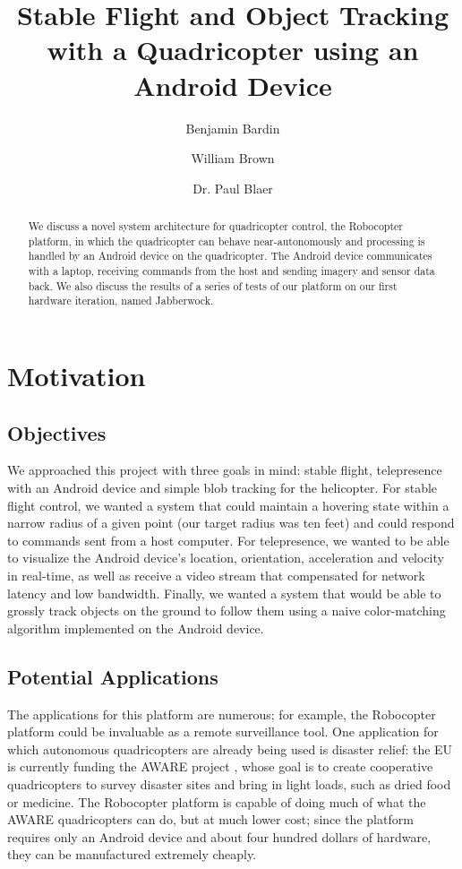 
\title{Stable Flight and Object Tracking with a Quadricopter using an
  Android Device}
\author{Benjamin Bardin \and William Brown 
  \and Dr. Paul Blaer}


\todolist

\maketitle

\begin{abstract}
  We discuss a novel system architecture for quadricopter control, the
  Robocopter platform, in which the quadricopter can behave
  near-autonomously and processing is handled by an Android device on
  the quadricopter. The Android device communicates with a laptop,
  receiving commands from the host and sending imagery and sensor data
  back. We also discuss the results of a series of tests of our
  platform on our first hardware iteration, named Jabberwock.
\end{abstract}
\tableofcontents

\section{Motivation}
\subsection{Objectives}
We approached this project with three goals in mind: stable flight,
telepresence with an Android device and simple blob tracking for the
helicopter. For stable flight control, we wanted a system that could
maintain a hovering state within a narrow radius of a given point (our
target radius was ten feet) and could respond to commands sent from a
host computer. For telepresence, we wanted to be able to visualize the
Android device's location, orientation, acceleration and velocity in
real-time, as well as receive a video stream that compensated for
network latency and low bandwidth. Finally, we wanted a system that
would be able to grossly track objects on the ground to follow them
using a naive color-matching algorithm implemented on the Android
device.

\subsection{Potential Applications}
The applications for this platform are numerous; for example, the
Robocopter platform could be invaluable as a remote surveillance
tool. One application for which autonomous quadricopters are already
being used is disaster relief: the EU is currently funding the AWARE
project \citep{aware}, whose goal is to create cooperative
quadricopters to survey disaster sites and bring in light loads, such
as dried food or medicine. The Robocopter platform is capable of doing
much of what the AWARE quadricopters can do, but at much lower cost;
since the platform requires only an Android device and about four
hundred dollars of hardware, they can be manufactured extremely
cheaply.

